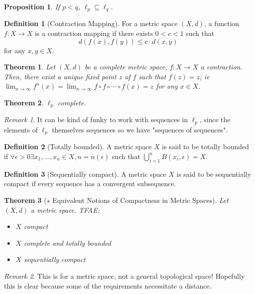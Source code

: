 \documentclass[12pt, oneside]{article}
\theoremstyle{definition}
\newtheorem{defn}{Definition}
\theoremstyle{plain}
\newtheorem{thm}{Theorem}
\newtheorem{prop}{Proposition}
\theoremstyle{remark}
\newtheorem{remark}{Remark}
\begin{document}
\begin{prop}
  If $p < q$, $\ell_p \subseteq \ell_q$.
\end{prop}

\begin{defn}[Contraction Mapping]
  For a metric space $(X, d)$, a function $f : X \to X$ is a contraction mapping if there exists $0 < c < 1$ such that \[
  d(f(x), f(y)) \leq c \cdot d(x,y)  
  \]
  for any $x, y \in X$.
\end{defn}

\begin{thm}
  Let $(X, d)$ be a complete metric space, $f : X \to X$ a contraction. Then, there exist a unique fixed point $z$ of $f$ such that $f(z) = z$; ie $\lim_{n \to \infty} f^{n}(x) = \lim_{n \to \infty} f\circ f \circ \cdots \circ f(x) = z$ for any $x \in X$.
\end{thm}

\begin{thm}
  $\ell_p$ complete.
\end{thm}
\begin{remark}
  It can be kind of funky to work with sequences in $\ell_p$, since the elements of $\ell_p$ themselves sequences so we have "sequences of sequences".  
\end{remark}

\begin{defn}[Totally bounded]
  A metric space $X$ is said to be totally bounded if $\forall \epsilon > 0 \exists x_1, \dots, x_n \in X, n = n(\epsilon)$ such that $\bigcup_{i=1}^n B(x_i, \epsilon) = X$.
\end{defn}

\begin{defn}[Sequentially compact]
  A metric space $X$ is said to be sequentially compact if every sequence has a convergent subsequence.
\end{defn}

\begin{thm}[\textcolor{red}{$\star$} Equivalent Notions of Compactness in Metric Spaces]
  Let $(X, d)$ a metric space. TFAE: \begin{itemize}
    \item $X$ compact
    \item $X$ complete and totally bounded
    \item $X$ sequentially compact
  \end{itemize}
\end{thm}

\begin{remark}
  This is for a metric space, not a general topological space! Hopefully this is clear because some of the requirements necessitate a distance.
\end{remark}
\end{document}
